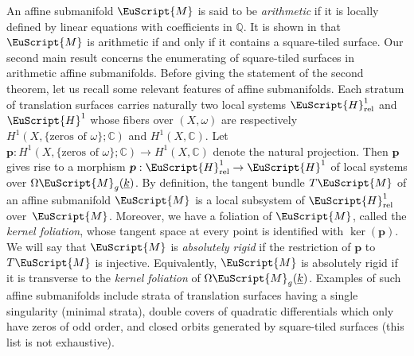 \documentclass[10pt]{amsart}
\let\mathcal\EuScript
\newcommand{\rel}{\mathrm{rel}}
\theoremstyle{plain}
\theoremstyle{definition}
\def\C{\mathbb{C}}
\newcommand{\Q}{\mathbb{Q}}
\newcommand{\pp}{\boldsymbol{p}}
\newcommand{\Mcal}{\mathcal{M}}
\newcommand{\cH}{\mathcal{H}}
\newcommand{\cM}{\mathcal{M}}
\let\ul\underline
\newcommand{\trate}{\Omega\Mcal_{g}(\ul{k})}
\begin{document}
An affine submanifold $\cM$ is said to be \emph{arithmetic} if it is locally defined by linear equations with coefficients in $\Q$. It is shown in \cite{Wright14} that $\Mcal$ is arithmetic if and only if it contains a square-tiled surface.
Our second main result concerns the enumerating of square-tiled surfaces in arithmetic affine submanifolds.
Before giving the statement of the second theorem, let us recall some relevant features of affine submanifolds.
Each stratum of translation surfaces carries naturally two local systems $\cH^1_{\rel}$ and $\cH^1$ whose fibers over $(X,\omega)$ are respectively $H^1(X,\{\textrm{zeros of } \omega\};\C)$ and $H^1(X,\C)$. Let $\pp: H^1(X,\{\textrm{zeros of } \omega\};\C) \to H^1(X,\C)$ denote the natural projection. Then $\pp$ gives rise to a morphism $\pp: \cH^1_{\rel} \to \cH^1$ of local systems over $\trate$.
By definition, the tangent bundle $T\cM$ of an affine submanifold $\cM$ is a local subsystem of $\cH^1_{\rel}$ over~$\cM$.
Moreover, we have a foliation of $\cM$, called the \emph{kernel foliation}, whose tangent space at every point is identified with $\ker(\pp)$.
We will say that $\Mcal$ is \emph{absolutely rigid} if the restriction of $\pp$ to $T\Mcal$ is injective.
Equivalently, $\Mcal$ is absolutely rigid if it is transverse to the \emph{kernel foliation} of $\trate$.
Examples of such affine submanifolds include strata of translation surfaces having a single singularity (minimal strata), double covers of quadratic differentials which only have zeros of odd order, and closed orbits generated by square-tiled surfaces (this list is not exhaustive).
\end{document}
